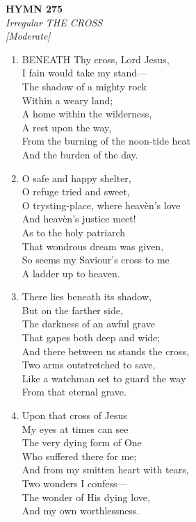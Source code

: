 \documentclass[11pt,a4paper]{article}
\begin{document}
\newpage
\begin{center}
    {\Large \textbf{HYMN 275}}
    \\
    \textit{Irregular THE CROSS}
    \\
    \textit{\small [Moderate]}
\end{center}
\vspace{1em}

\begin{enumerate}
    \item BENEATH Thy cross, Lord Jesus, \\
        I fain would take my stand--- \\
        The shadow of a mighty rock \\
        Within a weary land; \\
        A home within the wilderness, \\
        A rest upon the way, \\
        From the burning of the noon-tide heat \\
        And the burden of the day.

    \item O safe and happy shelter, \\
        O refuge tried and sweet, \\
        O trysting-place, where heav\`en's love \\
        And heav\`en's justice meet! \\
        As to the holy patriarch \\
        That wondrous dream was given, \\
        So seems my Saviour's cross to me \\
        A ladder up to heaven.

    \item There lies beneath its shadow, \\
        But on the farther side, \\
        The darkness of an awful grave \\
        That gapes both deep and wide; \\
        And there between us stands the cross, \\
        Two arms outstretched to save, \\
        Like a watchman set to guard the way \\
        From that eternal grave.

    \item Upon that cross of Jesus \\
        My eyes at times can see \\
        The very dying form of One \\
        Who suffered there for me; \\
        And from my smitten heart with tears, \\
        Two wonders I confess--- \\
        The wonder of His dying love, \\
        And my own worthlessness.


\end{enumerate}
\end{document}
